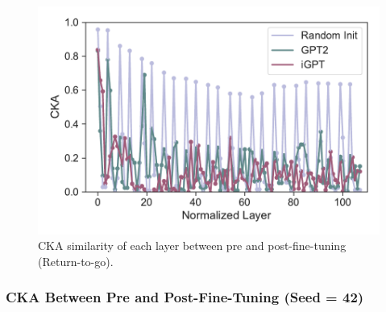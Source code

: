 \documentclass{article}
\begin{document}
\begin{figure}[H]
\begin{minipage}[b]{0.32\linewidth}
        \includegraphics[width=\linewidth]{figs/cka_plot_40_gpt2_igpt_dt_walker2d_medium_666_reward.pdf}
    \end{minipage}
    \caption{CKA similarity of each layer between pre and post-fine-tuning (Return-to-go).}
\end{figure}

\subsubsection{CKA Between Pre and Post-Fine-Tuning (Seed = 42)}
\end{document}
